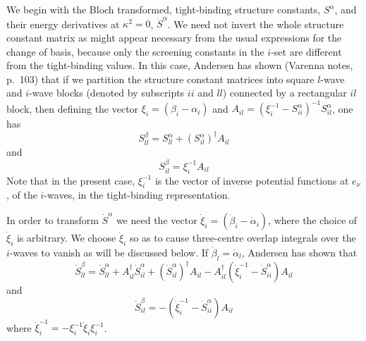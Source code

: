 \vskip 10pt
\vskip 5pt

We begin with the Bloch transformed, tight-binding structure constants,
$S^\alpha$, and their energy derivatives at
$\kappa^2=0$, $\dot S^\alpha$.
We need not invert the whole structure constant matrix as might appear
necessary from the usual expressions for the change of basis, because
only the screening constants in the $i$-set are different from the
tight-binding values. In this case, Andersen has shown
(Varenna notes, p.~103) that if we
partition the structure constant matrices into square
$l$-wave and $i$-wave blocks (denoted by subscripts $ii$ and $ll$)
connected by a rectangular $il$ block, then
defining the vector $\xi_i=(\beta_i-\alpha_i)$ and
$A_{il}={(\xi^{-1}_i - S^\alpha_{ii})}^{-1} S^\alpha_{il}$, one has
$$S^\beta_{ll}=S^\alpha_{ll} + (S^\alpha_{il})^\dagger A_{il}$$
and
$$S^\beta_{il}=\xi^{-1}_i A_{il}$$
Note that in the present case, $\xi^{-1}_i$ is the vector of
inverse potential functions at $e_\nu$, of the $i$-waves, in the
tight-binding representation.

In order to transform ${\dot S}^\alpha$ we need the vector
$\dot\xi_i=(\dot\beta_i-\dot\alpha_i)$,
where the choice of $\dot\xi_i$ is
arbitrary. We choose $\dot\xi_i$ so as to cause three-centre overlap
integrals over the $i$-waves to vanish as will be discussed below.
If $\dot\beta_l=\dot\alpha_l$, Andersen has shown that
$${\dot S}^\beta_{ll} = {\dot S}^\alpha_{ll}
                               + A_{il}^\dagger {\dot S}^\alpha_{il}
                               + ({\dot S}^\alpha_{il})^\dagger A_{il}
-A_{il}^\dagger ({\dot\xi}^{-1}_i - {\dot S}^\alpha_{ii}) A_{il}$$
and
$${\dot S}^\beta_{il} = -({\dot\xi}^{-1}_i - {\dot S}^\alpha_{ii}) A_{il}$$
where ${\dot\xi}^{-1}_i=-\xi^{-1}_i {\dot\xi}_i \xi^{-1}_i$.

